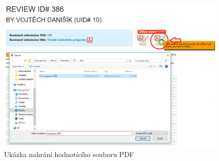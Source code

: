 \begin{figure}[h!]
\centering
\includegraphics[width=12cm]{img/upload}
\caption{Ukázka nahrání hodnotícího souboru PDF}
\label{fig:upload}
\end{figure}


 